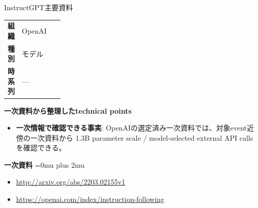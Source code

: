 \begin{technicalnote}{InstructGPT}{主要資料}
\begingroup
\begin{tabularx}{\linewidth}{@{}>{\bfseries}p{0.22\linewidth}X@{}}
組織 & OpenAI \\
種別 & モデル \\
時系列 & — \\
\end{tabularx}
\smallskip
{\bfseries 一次資料から整理したtechnical points}
\begin{itemize}[leftmargin=1.5em,itemsep=0.35em]
\item \textbf{一次情報で確認できる事実}: OpenAIの選定済み一次資料では、対象event近傍の一次資料から 1.3B parameter scale / model-selected external API calls を確認できる。
\end{itemize}
\begin{minipage}{\linewidth}
\begin{samepage}
{\bfseries 一次資料}
\begingroup\sloppy
\Urlmuskip=0mu plus 2mu\relax
\begin{itemize}[leftmargin=1.5em,itemsep=0.25em]
\item {\scriptsize\url{http://arxiv.org/abs/2203.02155v1}}
\item {\scriptsize\url{https://openai.com/index/instruction-following}}
\end{itemize}
\endgroup
\end{samepage}
\end{minipage}
\endgroup
\end{technicalnote}
\medskip

